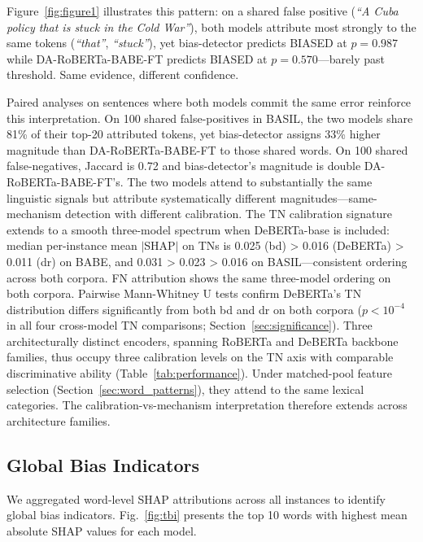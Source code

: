 \documentclass[11pt]{article}
\begin{document}
Figure~\ref{fig:figure1} illustrates this pattern: on a shared false positive (\textit{``A Cuba policy that is stuck in the Cold War''}), both models attribute most strongly to the same tokens (\textit{``that''}, \textit{``stuck''}), yet bias-detector predicts BIASED at $p = 0.987$ while DA-RoBERTa-BABE-FT predicts BIASED at $p = 0.570$---barely past threshold. Same evidence, different confidence.

Paired analyses on sentences where both models commit the same 
error reinforce this interpretation. On 100 shared false-positives in 
BASIL, the two models share 81\% of their top-20 attributed tokens, yet 
bias-detector assigns 33\% higher magnitude than DA-RoBERTa-BABE-FT to 
those shared words. On 100 shared false-negatives, Jaccard is 0.72 and 
bias-detector's magnitude is double DA-RoBERTa-BABE-FT's. The two 
models attend to substantially the same linguistic signals but attribute 
systematically different magnitudes---same-mechanism detection with 
different calibration.
The TN calibration signature extends to a smooth three-model spectrum 
when DeBERTa-base is included: median per-instance mean $|$SHAP$|$ on 
TNs is 0.025 (bd) > 0.016 (DeBERTa) > 0.011 (dr) on BABE, and 
0.031 > 0.023 > 0.016 on BASIL---consistent ordering across both 
corpora. FN attribution shows the same three-model ordering on both 
corpora. Pairwise Mann-Whitney U tests confirm DeBERTa's TN 
distribution differs significantly from both bd and dr on both 
corpora ($p < 10^{-4}$ in all four cross-model TN comparisons; 
Section~\ref{sec:significance}). Three architecturally distinct 
encoders, spanning RoBERTa and DeBERTa backbone families, thus 
occupy three calibration levels on the TN axis with comparable 
discriminative ability (Table~\ref{tab:performance}). Under 
matched-pool feature selection (Section~\ref{sec:word_patterns}), 
they attend to the same lexical categories. The calibration-vs-mechanism 
interpretation therefore extends across architecture families.
\subsection{Global Bias Indicators}
\label{sec:global_bias}

We aggregated word-level SHAP attributions across all instances to 
identify global bias indicators. Fig.~\ref{fig:tbi} presents the top 10 
words with highest mean absolute SHAP values for each model.
\end{document}
